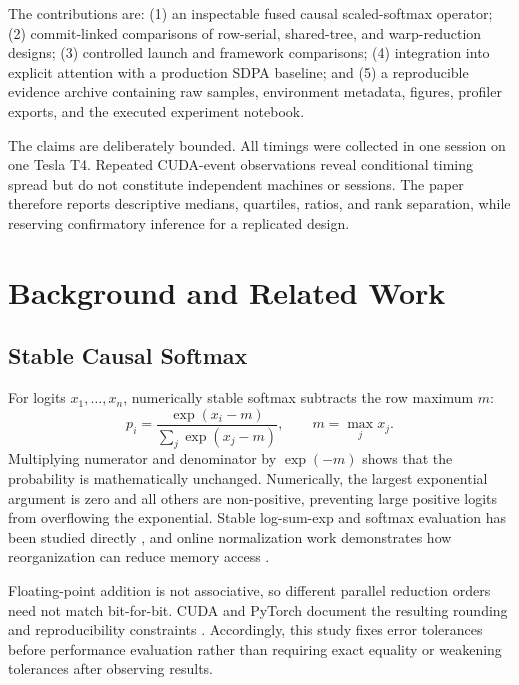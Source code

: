 \documentclass[twoside,twocolumn,10pt]{article}
\begin{document}
The contributions are: (1) an inspectable fused causal scaled-softmax operator;
(2) commit-linked comparisons of row-serial, shared-tree, and warp-reduction
designs; (3) controlled launch and framework comparisons; (4) integration into
explicit attention with a production SDPA baseline; and (5) a reproducible
evidence archive containing raw samples, environment metadata, figures,
profiler exports, and the executed experiment notebook.

The claims are deliberately bounded. All timings were collected in one session
on one Tesla T4. Repeated CUDA-event observations reveal conditional timing
spread but do not constitute independent machines or sessions. The paper
therefore reports descriptive medians, quartiles, ratios, and rank separation,
while reserving confirmatory inference for a replicated design.

\section{Background and Related Work}

\subsection{Stable Causal Softmax}

For logits $x_1,\ldots,x_n$, numerically stable softmax subtracts the row
maximum $m$:
\begin{equation}
p_i=\frac{\exp(x_i-m)}{\sum_j\exp(x_j-m)},\qquad m=\max_j x_j.
\label{eq:stable}
\end{equation}
Multiplying numerator and denominator by $\exp(-m)$ shows that the probability
is mathematically unchanged. Numerically, the largest exponential argument is
zero and all others are non-positive, preventing large positive logits from
overflowing the exponential. Stable log-sum-exp and softmax evaluation has
been studied directly \cite{blanchard2019}, and online normalization work
demonstrates how reorganization can reduce memory access \cite{milakov2018}.

Floating-point addition is not associative, so different parallel reduction
orders need not match bit-for-bit. CUDA and PyTorch document the resulting
rounding and reproducibility constraints \cite{cuda_fp_math,cuda_best_practices,
pytorch_numerical,pytorch_reproducibility}. Accordingly, this study fixes
error tolerances before performance evaluation rather than requiring exact
equality or weakening tolerances after observing results.
\end{document}

